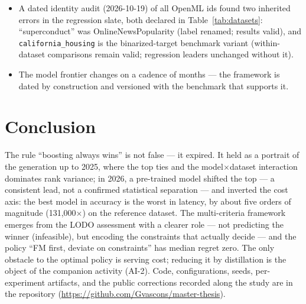 \documentclass[11pt]{article}
\begin{document}
\begin{itemize}
    the roster, not an effect of dating.
  \item A dated identity audit (2026-10-19) of all OpenML ids found two
    inherited errors in the regression slate, both declared in
    Table~\ref{tab:datasets}: ``superconduct'' was OnlineNewsPopularity
    (label renamed; results valid), and \texttt{california\_\allowbreak housing} is
    the binarized-target benchmark variant (within-dataset comparisons
    remain valid; regression leaders unchanged without it).
  \item The model frontier changes on a cadence of months --- the
    framework is dated by construction and versioned with the benchmark
    that supports it.
\end{itemize}

\section{Conclusion}

The rule ``boosting always wins'' is not false --- it expired. It held as
a portrait of the generation up to 2025, where the top ties and the
model$\times$dataset interaction dominates rank variance; in 2026, a
pre-trained model shifted the top --- a consistent lead, not a
confirmed statistical separation --- and
inverted the cost axis: the best model in accuracy is the worst in
latency, by about five orders of magnitude (131{,}000$\times$) on
the reference dataset. The multi-criteria framework emerges
from the LODO assessment with a clearer role --- not predicting the winner
(infeasible), but encoding the constraints that actually decide --- and
the policy ``FM first, deviate on constraints'' has median regret zero.
The only obstacle to the optimal policy is serving cost; reducing it by
distillation is the object of the companion activity (AI-2). Code,
configurations, seeds, per-experiment artifacts, and the public
corrections recorded along the study are in the repository
(\url{https://github.com/Gvascons/master-thesis}).



\end{document}

